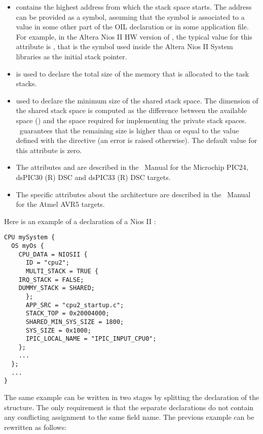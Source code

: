 \begin{itemize}
\item {} contains the highest address from which the
  stack space starts. The address can be provided as a symbol,
  assuming that the symbol is associated to a value in some other part
  of the OIL declaration or in some application file. For example, in
  the Altera Nios II HW version of \ee, the typical value for this
  attribute is , that is the symbol used
  inside the Altera Nios II System libraries as the initial stack
  pointer.

\item {} is used to declare the total size of the memory
  that is allocated to the task stacks.

\item {} used to declare the minimum size of
  the shared stack space. The dimension of the shared stack space is
  computed as the difference between the available space
  () and the space required for implementing the private
  stack spaces. \rtd\ guarantees that the remaining size is higher
  than or equal to the value defined with the
   directive (an error is raised
  otherwise). The default value for this attribute is zero.

\item The attributes  and  are described
  in the \ee\ Manual for the Microchip PIC24, dsPIC30 (R) DSC and
  dsPIC33 (R) DSC targets.

\item The specific attributes about the  architecture are
  described in the \ee\ Manual for the Atmel AVR5 targets.
\end{itemize}

Here is an example of a declaration of a Nios II :

\begin{lstlisting}
CPU mySystem {
  OS myOs {
    CPU_DATA = NIOSII {
      ID = "cpu2";
      MULTI_STACK = TRUE {
	IRQ_STACK = FALSE;
	DUMMY_STACK = SHARED;
      };
      APP_SRC = "cpu2_startup.c";
      STACK_TOP = 0x20004000;
      SHARED_MIN_SYS_SIZE = 1800;
      SYS_SIZE = 0x1000; 
      IPIC_LOCAL_NAME = "IPIC_INPUT_CPU0";
    };
    ...
  };
  ...
}
\end{lstlisting}

The same example can be written in two stages by splitting the
declaration of the structure. The only requirement is that the
separate declarations do not contain any conflicting assignment to the
same field name. The previous example can be rewritten as follows:

